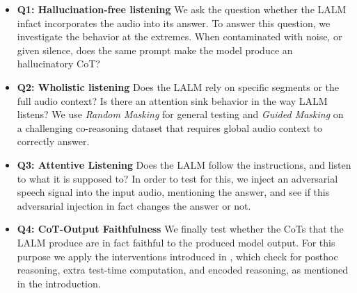 \begin{itemize}
    \item \textbf{Q1: Hallucination-free listening} We ask the question whether the LALM infact incorporates the audio into its answer. To answer this question, we investigate the behavior at the extremes. When contaminated with noise, or given silence, does the same prompt make the model produce an hallucinatory CoT?  
    
    
    \item \textbf{Q2: Wholistic listening} Does the LALM rely on specific segments or the full audio context? Is there an attention sink behavior in the way LALM listens? We use \textit{Random Masking} for general testing and \textit{Guided Masking} on a challenging co-reasoning dataset \cite{wang2025they} that requires global audio context to correctly answer.
    
    \item \textbf{Q3: Attentive Listening} Does the LALM follow the instructions, and listen to what it is supposed to? In order to test for this, we inject an adversarial speech signal into the input audio, mentioning the answer, and see if this adversarial injection in fact changes the answer or not.  
    
    
    \item \textbf{Q4: CoT-Output Faithfulness} We finally test whether the CoTs that the LALM produce are in fact faithful to the produced model output. For this purpose we apply the interventions introduced in \cite{lanham2023measuringfaithfulnesschainofthoughtreasoning}, which check for posthoc reasoning, extra test-time computation, and encoded reasoning, as mentioned in the introduction. 
\end{itemize}
